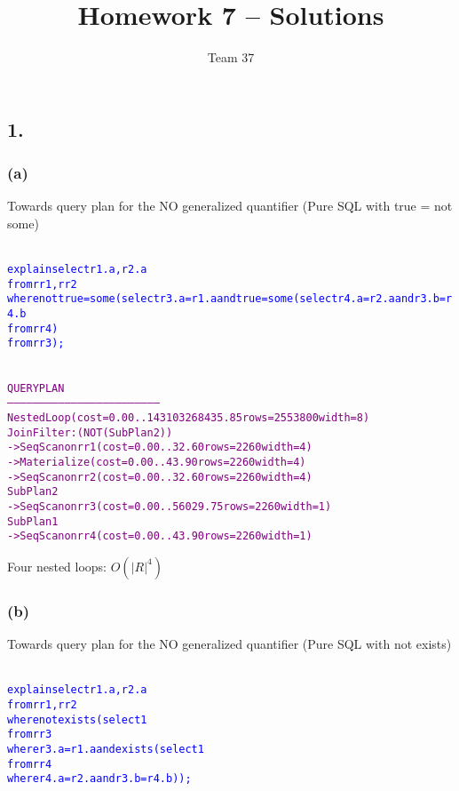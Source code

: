 \documentclass[10pt]{article}
\author{Team 37}
\title{Homework 7 -- Solutions}
\begin{document}
\maketitle
\subsection*{1.}
\subsubsection*{(a)}
Towards query plan for the NO generalized quantifier (Pure SQL
with true = not some)

\begin{alltt}\textcolor{blue}{
explain select r1.a,r2.a
        from r r1,r r2
        where not true=some(select r3.a=r1.a and true=some(select r4.a=r2.a and r3.b=r4.b
		                                                        from r r4)
			                       from r r3);}
\end{alltt}

{\footnotesize
\begin{alltt}
\textcolor{purple}{
                              QUERY PLAN
------------------------------------------------------------------------
 Nested Loop  (cost=0.00..143103268435.85 rows=2553800 width=8)
   Join Filter: (NOT (SubPlan 2))
   ->  Seq Scan on r r1  (cost=0.00..32.60 rows=2260 width=4)
   ->  Materialize  (cost=0.00..43.90 rows=2260 width=4)
         ->  Seq Scan on r r2  (cost=0.00..32.60 rows=2260 width=4)
   SubPlan 2
     ->  Seq Scan on r r3  (cost=0.00..56029.75 rows=2260 width=1)
           SubPlan 1
             ->  Seq Scan on r r4  (cost=0.00..43.90 rows=2260 width=1)
}
\end{alltt}
}

Four nested loops: $O(|R|^4)$
\subsubsection*{(b)}
Towards query plan for the NO generalized quantifier (Pure SQL
with not exists)

\begin{alltt}\textcolor{blue}{
explain select r1.a,r2.a
        from r r1,r r2
        where not exists(select 1
    				from r r3
    				where r3.a=r1.a and exists(select 1
    										  from r r4
    										  where r4.a=r2.a and r3.b=r4.b));
}
\end{alltt}
\end{document}
